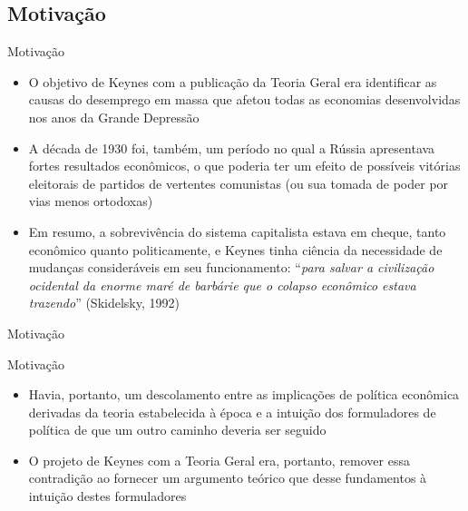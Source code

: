 \documentclass[10pt]{beamer}
\begin{document}
\subsection{Motivação}
\begin{frame}{Motivação}
    \begin{itemize}
        \item O objetivo de Keynes com a publicação da Teoria Geral era identificar as causas do desemprego em massa que afetou todas as economias desenvolvidas nos anos da Grande Depressão
        \bigskip
        \item A década de 1930 foi, também, um período no qual a Rússia apresentava fortes resultados econômicos, o que poderia ter um efeito de possíveis vitórias eleitorais de partidos de vertentes comunistas (ou sua tomada de poder por vias menos ortodoxas)
        \bigskip
        \item Em resumo, a sobrevivência do sistema capitalista estava em cheque, tanto econômico quanto politicamente, e Keynes tinha ciência da necessidade de mudanças consideráveis em seu funcionamento: ``\emph{para salvar a civilização ocidental da enorme maré de barbárie que o colapso econômico estava trazendo}'' (Skidelsky, 1992)
    \end{itemize}
\end{frame}

\begin{frame}{Motivação}
\end{frame}

\begin{frame}{Motivação}
    \begin{itemize}
        \item Havia, portanto, um descolamento entre as implicações de política econômica derivadas da teoria estabelecida à época e a intuição dos formuladores de política de que um outro caminho deveria ser seguido
        \bigskip
        \item O projeto de Keynes com a Teoria Geral era, portanto, remover essa contradição ao fornecer um argumento teórico que desse fundamentos à intuição destes formuladores
    \end{itemize}
\end{frame}
\end{document}
